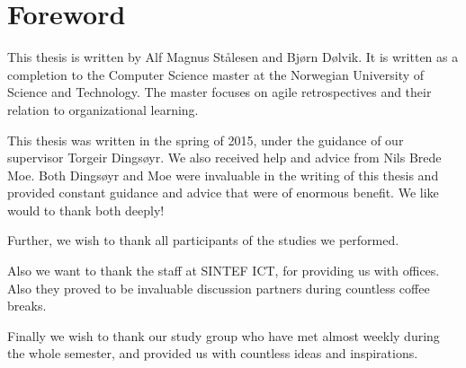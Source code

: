 \chapter*{Foreword}

This thesis is written by Alf Magnus Stålesen and Bjørn Dølvik. It is written as a completion to the Computer Science master at the Norwegian University of Science and Technology. The master focuses on agile retrospectives and their relation to organizational learning. 

This thesis was written in the spring of 2015, under the guidance of our supervisor Torgeir Dingsøyr. We also received help and advice from Nils Brede Moe. Both Dingsøyr and Moe were invaluable in the writing of this thesis and provided constant guidance and advice that were of enormous benefit. We like would to thank both deeply! 

Further, we wish to thank all participants of the studies we performed. 

Also we want to thank the staff at SINTEF ICT, for providing us with offices. Also they proved to be invaluable discussion partners during countless coffee breaks.

Finally we wish to thank our study group who have met almost weekly during the whole semester, and provided us with countless ideas and inspirations.